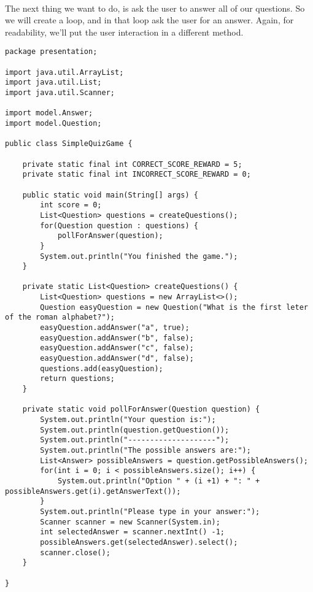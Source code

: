 \documentclass[11pt,fleqn]{book} %
\begin{document}
\paragraph{}The next thing we want to do, is ask the user to answer all of our questions. So we will create a loop, and in that loop ask the user for an answer.
Again, for readability, we'll put the user interaction in a different method.
\begin{lstlisting}
package presentation;

import java.util.ArrayList;
import java.util.List;
import java.util.Scanner;

import model.Answer;
import model.Question;

public class SimpleQuizGame {

	private static final int CORRECT_SCORE_REWARD = 5;
	private static final int INCORRECT_SCORE_REWARD = 0;
	
	public static void main(String[] args) {
		int score = 0;
		List<Question> questions = createQuestions();
		for(Question question : questions) {
			pollForAnswer(question);
		}
		System.out.println("You finished the game.");	
	}

	private static List<Question> createQuestions() {
		List<Question> questions = new ArrayList<>();
		Question easyQuestion = new Question("What is the first leter of the roman alphabet?");
		easyQuestion.addAnswer("a", true);
		easyQuestion.addAnswer("b", false);
		easyQuestion.addAnswer("c", false);
		easyQuestion.addAnswer("d", false);
		questions.add(easyQuestion);
		return questions;
	}
	
	private static void pollForAnswer(Question question) {
		System.out.println("Your question is:");
		System.out.println(question.getQuestion());
		System.out.println("--------------------");
		System.out.println("The possible answers are:");
		List<Answer> possibleAnswers = question.getPossibleAnswers();
		for(int i = 0; i < possibleAnswers.size(); i++) {
			System.out.println("Option " + (i +1) + ": " + possibleAnswers.get(i).getAnswerText());
		}
		System.out.println("Please type in your answer:");
		Scanner scanner = new Scanner(System.in);
		int selectedAnswer = scanner.nextInt() -1;
		possibleAnswers.get(selectedAnswer).select();
		scanner.close();
	}

}
\end{lstlisting}
\end{document}
